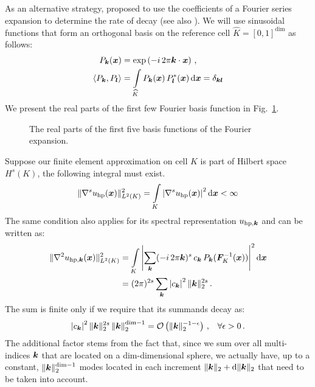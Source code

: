 As an alternative strategy, \textcite{bangerth2009} proposed to use the coefficients of a Fourier series expansion to determine the rate of decay (see also \textcite{dealiistep-27}). We will use sinusoidal functions that form an orthogonal basis on the reference cell $\widehat{K} = [0,1]^\text{dim}$ as follows:
\begin{align}
P_\tuple{k}(\vec{x}) &= \exp\left(- i \, 2\pi \tuple{k} \cdot \vec{x}\right) \,\text{,} \\
\langle P_\tuple{k}, P_\tuple{l} \rangle &= \int\limits_{\widehat{K}} P_\tuple{k}(\vec{x}) \, P_\tuple{l}^\ast(\vec{x}) \differential{\vec{x}} = \delta_{\tuple{k} \tuple{l}}
\end{align}
We present the real parts of the first few Fourier basis function in Fig.~\ref{fig:fourier}.

\begin{figure}
\centering

\caption{The real parts of the first five basis functions of the Fourier expansion.}
\label{fig:fourier}
\end{figure}

Suppose our finite element approximation on cell $K$ is part of Hilbert space $H^s(K)$, the following integral must exist.
\begin{align}
\| \nabla^s u_{\text{hp}}(\vec{x}) \|_{L^2(K)}^2 = \int\limits_K \left| \nabla^s u_{\text{hp}}(\vec{x}) \right|^2 \differential{\vec{x}} < \infty
\end{align}
The same condition also applies for its spectral representation $u_{\text{hp},\tuple{k}}$ and can be written as:
\begin{align}
\| \nabla^2 u_{\text{hp}, \tuple{k}}(\vec{x}) \|_{L^2(K)}^2 &= \int\limits_K \left| \sum\limits_{\tuple{k}} (-i \, 2 \pi \tuple{k})^s \, c_\tuple{k} \, P_\tuple{k}(\mat{F}_K^{-1}(\vec{x})) \right|^2 \differential{\vec{x}} \\
&= (2 \pi)^{2s} \sum\limits_{\tuple{k}} \left| c_\tuple{k} \right|^2 \|\tuple{k}\|_2^{2s} \,\text{.}
\end{align}
The sum is finite only if we require that its summands decay as:
\begin{align}
\left| c_\tuple{k} \right|^2 \|\tuple{k}\|_2^{2s} \left\| \tuple{k} \right\|_2^{\text{dim} - 1} = \mathcal{O}\left( \|\tuple{k}\|_2^{-1-\epsilon} \right) \,\text{,} \quad \forall \epsilon > 0 \,\text{.}
\end{align}
The additional factor stems from the fact that, since we sum over all multi-indices $\tuple{k}$ that are located on a dim-dimensional sphere, we actually have, up to a constant, $\|\tuple{k}\|_2^{\text{dim}-1}$ modes located in each increment $\|\tuple{k}\|_2 + \differential{\|\tuple{k}\|_2}$ that need to be taken into account. \textcite{dealiistep-27}

